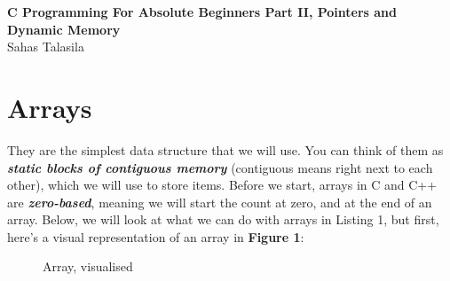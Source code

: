 \documentclass[a4paper,12pt]{article}
\begin{document}

\begin{titlepage}
    \centering
    \vspace*{2cm}
    \Huge{\textbf{C Programming For Absolute Beginners Part II, Pointers and Dynamic Memory}} \\[1.5cm]
    \Large{Sahas Talasila} \\[1cm]
    \vfill
    \vfill
\end{titlepage}

\pagestyle{fancy}

\tableofcontents
\newpage

\section{\huge{Arrays}}

They are the simplest data structure that we will use. You can think of them as \textbf{\textit{static blocks of contiguous memory}} (contiguous means right next to each other), which we will use to store items. Before we start, arrays in C and C++ are \textbf{\textit{zero-based}}, meaning we will start the count at zero, and at the end of an array. Below, we will look at what we can do with arrays in Listing 1, but first, here's a visual representation of an array in \textbf{Figure 1}:

\begin{figure}[H]
    \centering
    \caption{Array, visualised}
    \label{fig:enter-label}
\end{figure}

\hrulefill
\end{document}
